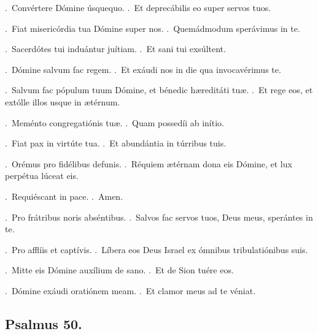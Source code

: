 \documentclass[12pt]{article} %
\newenvironment{response}{\leftskip 0in \setlength{\parindent}{0in}}{\vspace{1 mm}}
\let\oldgresixstar\gresixstar
\renewcommand{\gresixstar}{\textcolor{benred8}{\oldgresixstar}}
\let\oldVbar\Vbar
\renewcommand{\Vbar}{\textcolor{benred8}{\oldVbar .}}
\let\oldRbar\Rbar
\renewcommand{\Rbar}{\textcolor{benred8}{\oldRbar .}}
\begin{document}
\begin{response}
\Vbar\ Conv\'{e}rtere D\'{o}mine \'{u}squequo.
\Rbar\ Et deprec\'{a}bilis eo super servos tuos.

\Vbar\ Fiat miseric\'{o}rdia tua D\'{o}mine super nos.
\Rbar\ Quem\'{a}dmodum sper\'{a}vimus in te.

\Vbar\ Sacerd\'{o}tes tui indu\'{a}ntur ju\'{i}tiam.
\Rbar\ Et sani tui exs\'{u}ltent.

\Vbar\ D\'{o}mine salvum fac regem.
\Rbar\ Et ex\'{a}udi nos in die qua invocav\'{e}rimus te.

\Vbar\ Salvum fac p\'{o}pulum tuum D\'{o}mine, et b\'{e}nedic h\ae redit\'{a}ti tu\ae .
\Rbar\ Et rege eos, et ext\'{o}lle illos usque in \ae t\'{e}rnum.

\Vbar\ Mem\'{e}nto congregati\'{o}nis tu\ae .
\Rbar\ Quam possed\'{i}i ab in\'{i}tio.

\Vbar\ Fiat pax in virt\'{u}te tua. 
\Rbar\ Et abund\'{a}ntia in t\'{u}rribus tuis.

\Vbar\ Or\'{e}mus pro fid\'{e}libus defunis.
\Rbar\ R\'{e}quiem \ae t\'{e}rnam dona eis D\'{o}mine, et lux perp\'{e}tua l\'{u}ceat eis.

\Vbar\ Requi\'{e}scant in pace.
\Rbar\ Amen.

\Vbar\ Pro fr\'{a}tribus noris abs\'{e}ntibus.
\Rbar\ Salvos fac servos tuos, Deus meus, sper\'{a}ntes in te.

\Vbar\ Pro affl\'{i}is et capt\'{i}vis.
\Rbar\ L\'{i}bera eos Deus Israel ex \'{o}mnibus tribulati\'{o}nibus suis.

\Vbar\ Mitte eis D\'{o}mine aux\'{i}lium de sano.
\Rbar\ Et de Sion tu\'{e}re eos.

\Vbar\ D\'{o}mine ex\'{a}udi orati\'{o}nem meam.
\Rbar\ Et clamor meus ad te v\'{e}niat.

\end{response}

\subsection*{Psalmus 50.}



\end{document}
